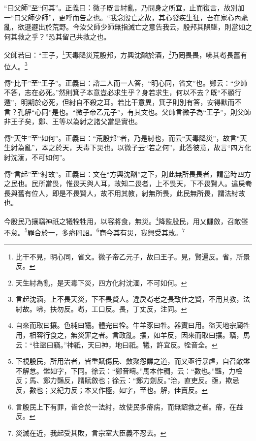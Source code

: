 {\noindent\shu{}\fzkt “曰父師”至“何其”。正義曰：微子既言紂亂，乃問身之所宜，止而復言，故別加一“曰父師少師”，更呼而告之也。“我念殷亡之故，其心發疾生狂，吾在家心內耄亂，欲遜遯出於荒野。今汝父師少師無指滅亡之意告我云，殷邦其隕墜，則當如之何其救之乎？”恐其留己共救之也。 \par}

父師若曰：“王子，\footnote{比干不見，明心同，省文。微子帝乙元子，故曰王子。見，賢遍反。省，所景反。}天毒降災荒殷邦，方興沈酗於酒，\footnote{天生紂為亂，是天毒下災，四方化紂沈湎，不可如何。}乃罔畏畏，咈其耇長舊有位人。\footnote{言起沈湎，上不畏天災，下不畏賢人。違戾耇老之長致仕之賢，不用其教，法紂故。咈，扶勿反。耇，工口反。長，丁丈反，注同。}


{\noindent\zhuan{}\fzbyks 傳“比干”至“王子”。正義曰：諮二人而一人答，“明心同，省文”也。鄭云：“少師不答，志在必死。”然則箕子本意豈必求生乎？身若求生，何以不去？既“不顧行遁”，明期於必死，但紂自不殺之耳。若比干意異，箕子則別有答，安得默而不言？孔解“心同”是也。“微子帝乙元子”，有其文也。父師言微子為“王子”，則父師非王子矣，鄭、王等以為紂之諸父當是實也。 \par}

{\noindent\zhuan{}\fzbyks 傳“天生”至“如何”。正義曰：“荒殷邦”者，乃是紂也，而云“天毒降災”，故言“天生紂為亂”，本之於天，天毒下災也。以微子云“若之何”，此答彼意，故言“四方化紂沈湎，不可如何”。 \par}

{\noindent\zhuan{}\fzbyks 傳“言起”至“紂故”。正義曰：文在“方興沈酗”之下，則此無所畏畏者，謂當時四方之民也。民所當畏，惟畏天與人耳，故知二畏者，上不畏天，下不畏賢人。違戾耇長與舊有位人，即是不畏賢人，故不用其教，紂無所畏，此民無所畏，謂法紂故也。 \par}

今殷民乃攘竊神祇之犧牷牲用，以容將食，無災。\footnote{自來而取曰攘。色純曰犧。體完曰牷。牛羊豕曰牲。器實曰用。盜天地宗廟牲用，相容行食之，無災罪之者。言政亂。攘，如羊反，因來而取曰攘。竊，馬云：“往盜曰竊。”神祇，天曰神，地曰祇。犧，許宜反。牷音全。}降監殷民，用乂讎斂，召敵讎不怠。\footnote{下視殷民，所用治者，皆重賦傷民、斂聚怨讎之道，而又亟行暴虐，自召敵讎不解怠。讎如字，下同。徐云：“鄭音疇。”馬本作稠，云：“數也。”豔，力檢反；馬、鄭力豔反，謂賦斂也；徐云：“鄭力劍反。”治，直吏反。亟，欺忌反，數也；又紀力反；本又作極，如字，至也。解，佳賣反。}罪合於一，多瘠罔詔。\footnote{言殷民上下有罪，皆合於一法紂，故使民多瘠病，而無詔救之者。瘠，在益反。}商今其有災，我興受其敗。\footnote{災滅在近，我起受其敗，言宗室大臣義不忍去。}


